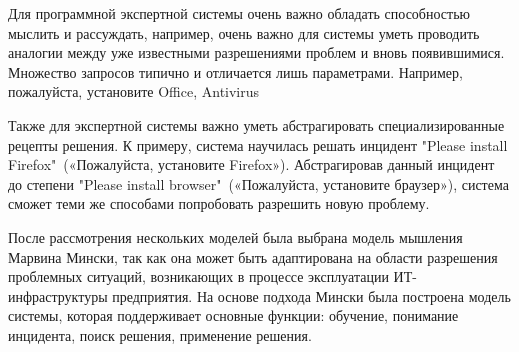 Для программной экспертной системы очень важно обладать способностью мыслить и рассуждать, например, очень важно для системы уметь проводить аналогии между уже известными разрешениями проблем и вновь появившимися. Множество запросов типично и отличается лишь параметрами. Например, пожалуйста, установите Office, Antivirus \etc\ \par
Также для экспертной системы важно уметь абстрагировать специализированные рецепты решения. К примеру, система научилась решать инцидент "Please install Firefox"\ («Пожалуйста, установите Firefox»). Абстрагировав данный инцидент до степени "Please install browser"\  («Пожалуйста, установите браузер»), система сможет теми же способами попробовать разрешить новую проблему.\par
После рассмотрения нескольких моделей была выбрана модель мышления Марвина Мински, так как она может быть адаптирована на области разрешения проблемных ситуаций, возникающих в процессе эксплуатации ИТ-инфраструктуры предприятия. На основе подхода Мински была построена модель системы, которая поддерживает основные функции: обучение, понимание инцидента, поиск решения, применение решения. 

\clearpage

